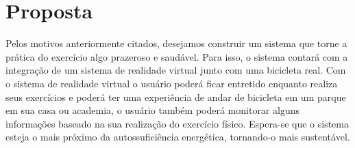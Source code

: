 \chapter[Proposta]{Proposta}

Pelos motivos anteriormente citados, desejamos construir um sistema que torne a prática do exercício algo prazeroso e saudável. Para isso, o sistema contará 
com a integração de um sistema de realidade virtual junto com uma bicicleta real. Com o sistema de realidade virtual o usuário poderá ficar entretido enquanto 
realiza seus exercícios e poderá ter uma experiência de andar de bicicleta em um parque em sua casa ou academia, o usuário também poderá monitorar
alguns informações baseado na sua realização do exercício físico. Espera-se que o sistema esteja o mais próximo da autossuficiência energética, tornando-o mais
sustentável.

